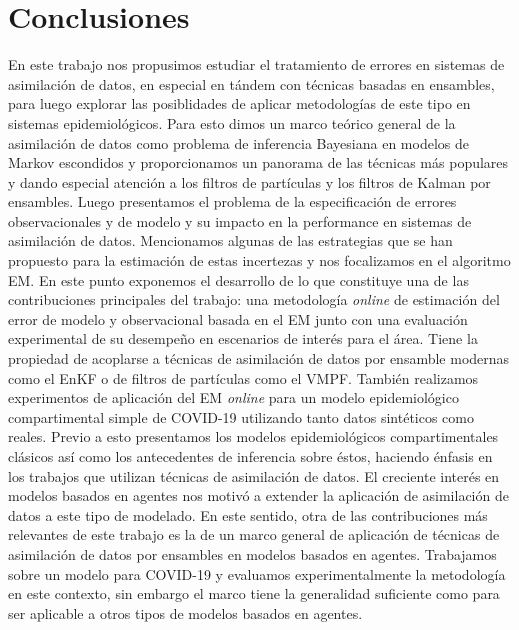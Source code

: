 \chapter{Conclusiones} \label{chp:conclusion}

En este trabajo nos propusimos estudiar el tratamiento de errores en sistemas de asimilación de datos, en especial en tándem con técnicas basadas en ensambles, para luego explorar las posiblidades de aplicar metodologías de este tipo en sistemas epidemiológicos. Para esto dimos un marco teórico general de la asimilación de datos como problema de inferencia Bayesiana en modelos de Markov escondidos y proporcionamos un panorama de las técnicas más populares y dando especial atención a los filtros de partículas y los filtros de Kalman por ensambles. Luego presentamos el problema de la especificación de errores observacionales y de modelo y su impacto en la performance en sistemas de asimilación de datos. Mencionamos algunas de las estrategias que se han propuesto para la estimación de estas incertezas y nos focalizamos en el algoritmo EM. En este punto exponemos el desarrollo de lo que constituye una de las contribuciones principales del trabajo: una metodología \textit{online} de estimación del error de modelo y observacional basada en el EM junto con una evaluación experimental de su desempeño en escenarios de interés para el área. Tiene la propiedad de acoplarse a técnicas de asimilación de datos por ensamble modernas como el EnKF o de filtros de partículas como el VMPF. También realizamos experimentos de aplicación del EM \textit{online} para un modelo epidemiológico compartimental simple de COVID-19 utilizando tanto datos sintéticos como reales. Previo a esto presentamos los modelos epidemiológicos compartimentales clásicos así como los antecedentes de inferencia sobre éstos, haciendo énfasis en los trabajos que utilizan técnicas de asimilación de datos. El creciente interés en modelos basados en agentes nos motivó a extender la aplicación de asimilación de datos a este tipo de modelado. En este sentido, otra de las contribuciones más relevantes de este trabajo es la de un marco general de aplicación de técnicas de asimilación de datos por ensambles en modelos basados en agentes. Trabajamos sobre un modelo para COVID-19 y evaluamos experimentalmente la metodología en este contexto, sin embargo el marco tiene la generalidad suficiente como para ser aplicable a otros tipos de modelos basados en agentes.


